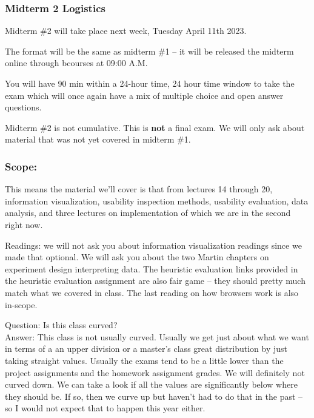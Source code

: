 \subsubsection{Midterm 2 Logistics}
Midterm \#2 will take place next week, Tuesday April 11th 2023. 

The format will be the same as midterm \#1 -- it will be released the midterm online through bcourses at 09:00 A.M. 

You will have 90 min within a 24-hour time, 24 hour time window to take the exam which will once again have a mix of multiple choice and open answer questions. 
\begin{important}
Midterm \#2 is not cumulative. This is \textbf{not} a final exam. We will only ask about material that was not yet covered in midterm \#1. 
\end{important}

\subsubsection{Scope:}
\begin{shaded}
This means the material we'll cover is that from lectures 14 through 20, information visualization, usability inspection methods, usability evaluation, data analysis, and three lectures on implementation of which we are in the second right now. 
\end{shaded}

Readings: we will not ask you about information visualization readings since we made that optional. We will ask you about the two Martin chapters on experiment design interpreting data. The heuristic evaluation links provided in the heuristic evaluation assignment are also fair game -- they should pretty much match what we covered in class. The last reading on how browsers work is also in-scope.

Question: Is this class curved?\\
Answer: This class is not usually curved. Usually we get just about what we want in terms of a an upper division or a master's class great distribution by just taking straight values. Usually the exams tend to be a little lower than the project assignments and the homework assignment grades. We will definitely not curved down. We can take a look if all the values are significantly below where they should be. If so, then we curve up but haven't had to do that in the past -- so I would not expect that to happen this year either. 

